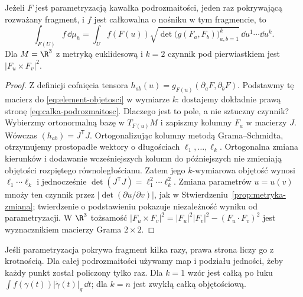 \begin{twierdzenie}
\label{thm:calka-podrozmaitosc}
Jeżeli $F$ jest parametryzacją kawałka
podrozmaitości, jeden raz pokrywającą
rozważany fragment, i $f$ jest całkowalna
o nośniku w tym fragmencie, to
\begin{equation}\label{eq:calka-podrozmaitosc}
 \int_{F(U)}f\,\dd\mu_h
 =\int_U f(F(u))
   \sqrt{\det\bigl(g(F_a,F_b)\bigr)_{a,b=1}^k}
                      \,\dd u^1\cdots\dd u^k .
\end{equation}
Dla $M=\R^3$ z metryką euklidesową i $k=2$ czynnik pod pierwiastkiem
jest $|F_u\times F_v|^2$.
\end{twierdzenie}
\begin{proof}
Z definicji cofnięcia tensora
$h_{ab}(u)=g_{F(u)}(\partial_aF,\partial_bF)$.
Podstawmy tę macierz do
\eqref{eq:element-objetosci} w wymiarze $k$:
dostajemy dokładnie prawą stronę
\eqref{eq:calka-podrozmaitosc}.
Dlaczego jest to pole, a nie sztuczny czynnik?
Wybierzmy ortonormalną bazę w $T_{F(u)}M$
i zapiszmy kolumny $F_a$ w macierzy $J$.
Wówczas $(h_{ab})=J^{\mathsf T}J$.
Ortogonalizując kolumny metodą Grama--Schmidta,
otrzymujemy prostopadłe wektory o długościach
$\ell_1,\ldots,\ell_k$. Ortogonalna zmiana
kierunków i dodawanie wcześniejszych kolumn
do późniejszych nie zmieniają objętości
rozpiętego równoległościanu. Zatem jego
$k$-wymiarowa objętość wynosi
$\ell_1\cdots\ell_k$ i jednocześnie
$\det(J^{\mathsf T}J)=\ell_1^2\cdots\ell_k^2$.
Zmiana parametrów $u=u(v)$ mnoży ten czynnik
przez $|\det(\partial u/\partial v)|$,
jak w Stwierdzeniu~\ref{prop:metryka-zmiana};
twierdzenie o podstawieniu pokazuje
niezależność wyniku od parametryzacji.
W $\R^3$ tożsamość
$|F_u\times F_v|^2
=|F_u|^2|F_v|^2-(F_u\cdot F_v)^2$
jest wyznacznikiem macierzy Grama $2\times2$.
\end{proof}

Jeśli parametryzacja pokrywa fragment kilka
razy, prawa strona liczy go z krotnością.
Dla całej podrozmaitości używamy map
i podziału jedności, żeby każdy punkt
został policzony tylko raz. Dla $k=1$
wzór jest całką po łuku
$\int f(\gamma(t))|\dot\gamma(t)|_g\,\dd t$;
dla $k=n$ jest zwykłą całką objętościową.

